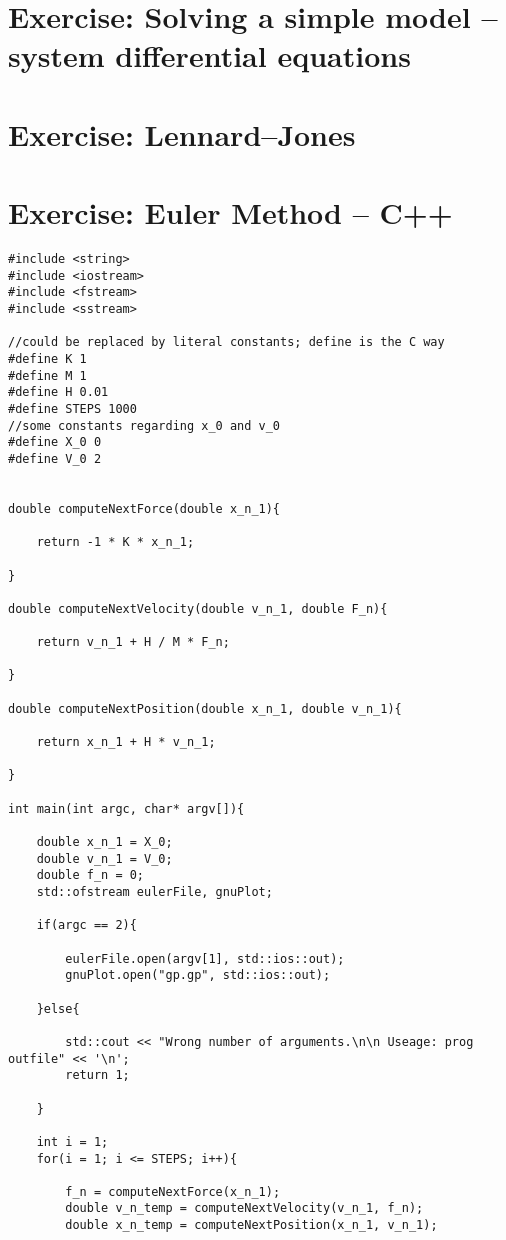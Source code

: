 \documentclass[11pt]{article}
\begin{document}
\date{\today}

\section{Exercise: Solving a simple model -- system differential equations}

\section{Exercise: Lennard--Jones}

\section{Exercise: Euler Method -- C++}
\begin{lstlisting}
#include <string>
#include <iostream>
#include <fstream>
#include <sstream>

//could be replaced by literal constants; define is the C way
#define K 1
#define M 1
#define H 0.01
#define STEPS 1000
//some constants regarding x_0 and v_0
#define X_0 0
#define V_0 2


double computeNextForce(double x_n_1){

	return -1 * K * x_n_1;

}

double computeNextVelocity(double v_n_1, double F_n){

	return v_n_1 + H / M * F_n;

}

double computeNextPosition(double x_n_1, double v_n_1){

	return x_n_1 + H * v_n_1;

}

int main(int argc, char* argv[]){

	double x_n_1 = X_0;
	double v_n_1 = V_0;
	double f_n = 0;
	std::ofstream eulerFile, gnuPlot;

	if(argc == 2){

		eulerFile.open(argv[1], std::ios::out);
		gnuPlot.open("gp.gp", std::ios::out);

	}else{

		std::cout << "Wrong number of arguments.\n\n Useage: prog outfile" << '\n';
		return 1;

	}

	int i = 1;
	for(i = 1; i <= STEPS; i++){

		f_n = computeNextForce(x_n_1);
		double v_n_temp = computeNextVelocity(v_n_1, f_n);
		double x_n_temp = computeNextPosition(x_n_1, v_n_1);


\end{lstlisting}
\end{document}
